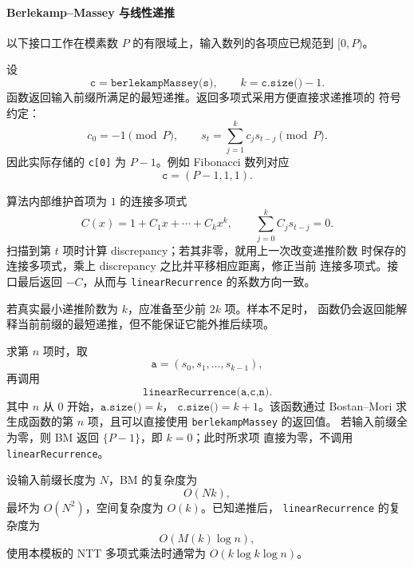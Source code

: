\paragraph*{Berlekamp--Massey 与线性递推}

以下接口工作在模素数 \(P\) 的有限域上，输入数列的各项应已规范到
\([0,P)\)。

设
\[
\texttt{c}=\texttt{berlekampMassey(s)},\qquad
k=\texttt{c.size()}-1.
\]
函数返回输入前缀所满足的最短递推。返回多项式采用方便直接求递推项的
符号约定：
\[
c_0=-1\pmod P,\qquad
s_t=\sum_{j=1}^{k}c_j s_{t-j}\pmod P.
\]
因此实际存储的 \texttt{c[0]} 为 \(P-1\)。例如 Fibonacci 数列对应
\[
\texttt{c}=(P-1,1,1).
\]

算法内部维护首项为 \(1\) 的连接多项式
\[
C(x)=1+C_1x+\cdots+C_kx^k,
\qquad
\sum_{j=0}^{k}C_j s_{t-j}=0.
\]
扫描到第 \(t\) 项时计算 discrepancy；若其非零，就用上一次改变递推阶数
时保存的连接多项式，乘上 discrepancy 之比并平移相应距离，修正当前
连接多项式。接口最后返回 \(-C\)，从而与
\texttt{linearRecurrence} 的系数方向一致。

若真实最小递推阶数为 \(k\)，应准备至少前 \(2k\) 项。样本不足时，
函数仍会返回能解释当前前缀的最短递推，但不能保证它能外推后续项。

求第 \(n\) 项时，取
\[
\texttt{a}=(s_0,s_1,\ldots,s_{k-1}),
\]
再调用
\[
\texttt{linearRecurrence(a,c,n)}.
\]
其中 \(n\) 从 \(0\) 开始，\(\texttt{a.size()}=k\)，
\(\texttt{c.size()}=k+1\)。该函数通过 Bostan--Mori 求生成函数的第
\(n\) 项，且可以直接使用 \texttt{berlekampMassey} 的返回值。
若输入前缀全为零，则 BM 返回 \(\{P-1\}\)，即 \(k=0\)；此时所求项
直接为零，不调用 \texttt{linearRecurrence}。

设输入前缀长度为 \(N\)，BM 的复杂度为
\[
O(Nk),
\]
最坏为 \(O(N^2)\)，空间复杂度为 \(O(k)\)。已知递推后，
\texttt{linearRecurrence} 的复杂度为
\[
O(M(k)\log n),
\]
使用本模板的 NTT 多项式乘法时通常为
\(O(k\log k\log n)\)。
